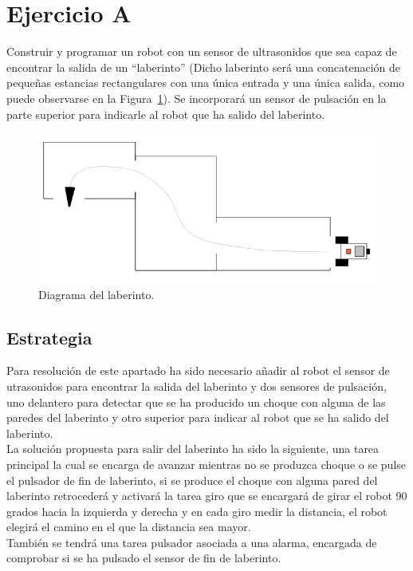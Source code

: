 \section{Ejercicio A}
Construir y programar un robot con un sensor de ultrasonidos que sea capaz de encontrar la salida de un ``laberinto'' (Dicho laberinto será una concatenación de pequeñas estancias rectangulares con una única entrada y una única salida, como puede observarse en la Figura~\ref{laberinto}). 
Se incorporará un sensor de pulsación en la parte superior para indicarle al robot que ha salido del laberinto.

\begin{figure}[H]
 \centering
 \includegraphics[scale=0.5]{./img/laberinto.png}
 \caption{Diagrama del laberinto.}
 \label{laberinto}
\end{figure}
\subsection{Estrategia}
Para resolución de este apartado ha sido necesario añadir al robot el sensor de utrasonidos para encontrar la salida del laberinto y dos sensores de pulsación, uno delantero para detectar que se ha producido un choque con alguna de las paredes del laberinto y otro superior para indicar al robot que se ha salido del laberinto.\\

La solución propuesta para salir del laberinto ha sido la siguiente, una tarea principal la cual se encarga de avanzar mientras no se produzca choque o se pulse el pulsador de fin de laberinto, si se produce el choque con alguna pared del laberinto retrocederá y activará la tarea giro que se encargará de girar el robot 90 grados hacia la izquierda y derecha y en cada giro medir la distancia, el robot elegirá el camino en el que la distancia sea mayor. \\

También se tendrá una tarea pulsador asociada a una alarma, encargada de comprobar si se ha pulsado el sensor de fin de laberinto.

